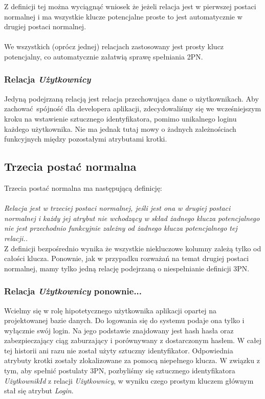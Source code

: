 \documentclass{mwrep}
\begin{document}
Z definicji tej można wyciągnąć wniosek że jeżeli relacja jest w pierwszej postaci normalnej i ma wszystkie 
klucze potencjalne proste to jest automatycznie w drugiej postaci normalnej.\\
\\
We wszystkich (oprócz jednej) relacjach zastosowany jest prosty klucz potencjalny, co automatycznie załatwią sprawę spełniania 2PN.

\subsubsection{Relacja \emph{Użytkownicy}}
Jedyną podejrzaną relacją jest relacja przechowująca dane o użytkownikach. Aby zachować spójność dla developera aplikacji, zdecydowaliśmy się 
we wcześniejszym kroku na wstawienie sztucznego identyfikatora, pomimo unikalnego loginu każdego użytkownika. Nie ma jednak 
tutaj mowy o żadnych zależnościach funkcyjnych między pozostałymi atrybutami krotki.

\subsection{Trzecia postać normalna}
Trzecia postać normalna ma następującą definicję:\\
\\
\emph{Relacja jest w trzeciej postaci normalnej, jeśli jest ona w drugiej
postaci normalnej i każdy jej atrybut nie wchodzący w skład żadnego
klucza potencjalnego nie jest przechodnio funkcyjnie zależny
od żadnego klucza potencjalnego tej relacji.\cite{Kowalczyk1}.}\\

Z definicji bezpośrednio wynika że wszystkie niekluczowe kolumny zależą tylko od całości klucza. Ponownie, jak w przypadku rozważań 
na temat drugiej postaci normalnej, mamy tylko jedną relację podejrzaną o niespełnianie definicji 3PN.

\subsubsection{Relacja \emph{Użytkownicy} ponownie...}
Wcielmy się w rolę hipotetycznego użytkownika aplikacji opartej na projektowanej bazie danych. Do logowania się 
do systemu podaje ona tylko i wyłącznie swój login. Na jego podstawie znajdowany jest hash hasła oraz zabezpieczający
ciąg zaburzający i porównywany z dostarczonym hasłem. W całej tej historii ani razu nie został użyty sztuczny identyfikator. 
Odpowiednia atrybuty krotki zostały zlokalizowane za pomocą niepełnego klucza. W związku z tym, aby spełnić postulaty 3PN, pozbyliśmy się
sztucznego identyfikatora \emph{UżytkownikId} z relacji \emph{Użytkownicy}, w wyniku czego prostym kluczem głównym stał się atrybut \emph{Login}.
\end{document}
